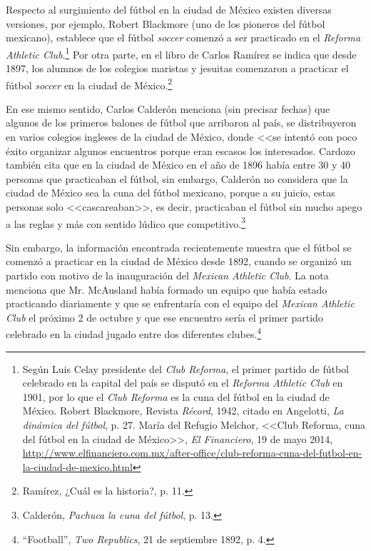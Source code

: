 \documentclass[11pt,a5paper,twoside]{book} %
\begin{document}
Respecto al surgimiento del fútbol en la ciudad de México existen diversas versiones,
por ejemplo, Robert Blackmore (uno de los pioneros del fútbol mexicano), establece que el
fútbol \emph{soccer} comenzó a ser practicado en el \emph{Reforma Athletic Club}.\footnote{Según Luis Celay presidente del \emph{Club Reforma}, el primer partido de fútbol celebrado en la capital del país se disputó en el \emph{Reforma Athletic Club} en 1901, por lo que el \emph{Club Reforma} es la cuna del fútbol en la ciudad de México. Robert Blackmore, Revista \emph{Récord}, 1942, citado en Angelotti, \emph{La dinámica del fútbol}, p. 27. María del Refugio Melchor, <<Club Reforma, cuna del fútbol en la ciudad de México>>, \emph{El Financiero}, 19 de mayo 2014, \url{http://www.elfinanciero.com.mx/after-office/club-reforma-cuna-del-futbol-en-la-ciudad-de-mexico.html}} Por otra parte, en el
libro de Carlos Ramírez se indica que desde 1897, los alumnos de los colegios maristas y
jesuitas comenzaron a practicar el fútbol \emph{soccer} en la ciudad de México.\footnote{Ramírez, ¿Cuál es la historia?, p. 11.}

En ese mismo sentido, Carlos Calderón menciona (sin precisar fechas) que algunos
de los primeros balones de fútbol que arribaron al país, se distribuyeron en varios colegios ingleses de la ciudad de México, donde <<se intentó con poco éxito organizar algunos encuentros porque eran escasos los interesados. Cardozo también cita que en la ciudad de México en el año de 1896 había entre 30 y 40 personas que practicaban el fútbol, sin embargo,
Calderón no considera que la ciudad de México sea la cuna del fútbol mexicano, porque a su juicio, estas personas  solo <<cascareaban>>, es decir, practicaban el fútbol sin mucho apego a las reglas y más con sentido lúdico que competitivo.\footnote{Calderón, \emph{Pachuca la cuna del fútbol}, p. 13.}

Sin embargo, la información encontrada recientemente muestra que el fútbol se
comenzó a practicar en la ciudad de México desde 1892, cuando se organizó un partido con
motivo de la inauguración del \emph{Mexican Athletic Club}. La nota menciona que Mr. McAusland
había formado un equipo que había estado practicando diariamente y que se enfrentaría con el equipo del \emph{Mexican Athletic Club} el próximo 2 de octubre y que ese encuentro sería el
primer partido celebrado en la ciudad jugado entre dos diferentes clubes.\footnote{``Football'', \emph{Two Republics}, 21 de septiembre 1892, p. 4.}
\end{document}
